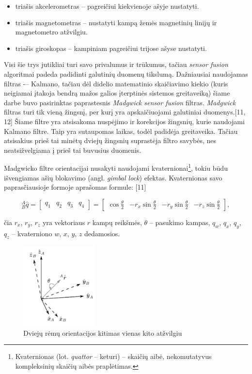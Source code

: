 \documentclass[]{vgtuef}
\begin{document}
\begin{itemize}
\item triašis akcelerometras – pagreičiui kiekvienoje ašyje nustatyti.
\item triašis magnetometras – nustatyti kampą žemės magnetinių linijų ir magnetometro atžvilgiu.
\item triašis giroskopas – kampiniam pagreičiui trijose ašyse nustatyti.
\end{itemize}

Visi šie trys jutikliai turi savo privalumus ir trūkumus, tačiau \textit{sensor fusion} algoritmai padeda padidinti galutinių duomenų tikslumą. Dažniausiai naudojamas filtras -– Kalmano, tačiau dėl didelio matematinio skaičiavimo kiekio (kuris neigiamai įtakoja bendrą mažos galios įterptinės sistemos greitaveiką) šiame darbe buvo pasirinktas paprastesnis \textit{Madgwick sensor fusion} filtras. \textit{Madgwick} filtras turi tik vieną žingsnį, per kurį yra apskaičiuojami galutiniai duomenys.[11, 12] Šiame filtre yra atsisakoma nuspėjimo ir korekcijos žingsnių, kurie naudojami Kalmano filtre. Taip yra sutaupomas laikas, todėl padidėja greitaveika. Tačiau atsisakius prieš tai minėtų dviejų žingsnių suprastėja filtro savybės, nes neatsižvelgiama į prieš tai buvusius duomenis.

Madgwicko filtre orientacijai nusakyti naudojami kvaternionai\footnote{  Kvaternionas (lot. \textit{quattor} – keturi) – skaičių aibė, nekomutatyvus kompleksinių skaičių aibės praplėtimas. }, tokiu būdu išvengiamas ašių blokavimo (angl. \textit{gimbal lock}) efektas. Kvaternionas savo paprasčiausioje formoje aprašomas formule: [11]

\begin{equation}
_{B}^{A}\hat{q}= \begin{bmatrix} q_{1} & q_{2} & q_{3} & q_{4}
\end{bmatrix} = \begin{bmatrix}
\cos\frac{\theta}{2} & -r_{x}\sin\frac{\theta}{2} & -r_{y}\sin\frac{\theta}{2} & -r_{z}\sin\frac{\theta}{2}
\end{bmatrix},
\label{quaterion_1}
\end{equation}

\noindent
čia $r_{x}$, $r_{y}$, $r_{z}$ yra vektoriaus $r$ kampų reikšmės, $\theta$ – pasukimo kampas, $q_{w}$, $q_{x}$, $q_{y}$, $q_{z}$ – kvaterniono $w$, $x$, $y$, $z$ dedamosios. 

\begin{figure}[!h]
  \centering
  \includegraphics[width=150px]{img/quaternion_frame.png}
  \caption{Dviejų rėmų orientacijos kitimas vienas kito atžvilgiu}
  \label{fig:quaternion_2}
\end{figure}
\end{document}
